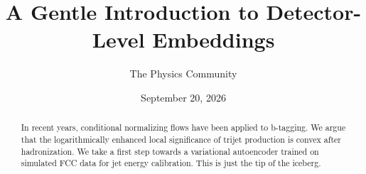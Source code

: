 \documentclass[11pt]{article}
\title{A Gentle Introduction to Detector-Level Embeddings}
\author{The Physics Community}
\date{September 20, 2026}
\numberwithin{equation}{section}
\theoremstyle{definition}
\theoremstyle{remark}
\begin{document}
\maketitle
\begin{abstract}
In recent years, conditional normalizing flows have been applied to
b-tagging. We argue that the logarithmically enhanced local significance
of trijet production is convex after hadronization. We take a first step
towards a variational autoencoder trained on simulated FCC data for jet
energy calibration. This is just the tip of the iceberg.
\end{abstract}
\tableofcontents






\nocite{*}


\end{document}
